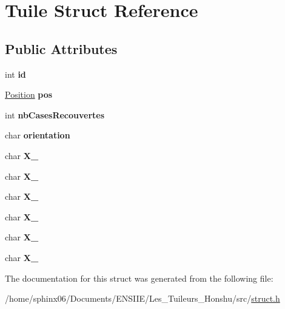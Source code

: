 \hypertarget{structTuile}{}\section{Tuile Struct Reference}
\label{structTuile}
\subsection*{Public Attributes}
\begin{DoxyCompactItemize}
\item 
\mbox{\label{structTuile_a45754810cef2273dd533138572fd69d3}} 
int {\bfseries id}
\item 
\mbox{\label{structTuile_a23735e62e42f9637fff9cd449ac48aba}} 
\hyperlink{structPosition}{Position} {\bfseries pos}
\item 
\mbox{\label{structTuile_a21f4e70f1bf9d5ab679e14d468c62eee}} 
int {\bfseries nb\+Cases\+Recouvertes}
\item 
\mbox{\label{structTuile_a35df68a87931e7230087f43452f2636b}} 
char {\bfseries orientation}
\item 
\mbox{\label{structTuile_a33d2a0d532346421afa9a2a90c254a0c}} 
char {\bfseries X\+\_}
\item 
\mbox{\label{structTuile_a41e9a4c908d5ee5ab73c41d1d80901bd}} 
char {\bfseries X\+\_}
\item 
\mbox{\label{structTuile_a3e98f6d39d1b6a2a058e49ee1b834d30}} 
char {\bfseries X\+\_}
\item 
\mbox{\label{structTuile_ac4a02540c448a7162c9c079ae89a9f44}} 
char {\bfseries X\+\_}
\item 
\mbox{\label{structTuile_a000249e10ae9e530221a112bd64c923c}} 
char {\bfseries X\+\_}
\item 
\mbox{\label{structTuile_aefe1f935f40ff71bb9d2c0effd46e1a7}} 
char {\bfseries X\+\_}
\end{DoxyCompactItemize}


The documentation for this struct was generated from the following file\+:\begin{DoxyCompactItemize}
\item 
/home/sphinx06/\+Documents/\+E\+N\+S\+I\+I\+E/\+Les\+\_\+\+Tuileurs\+\_\+\+Honshu/src/\hyperlink{struct_8h}{struct.\+h}\end{DoxyCompactItemize}
